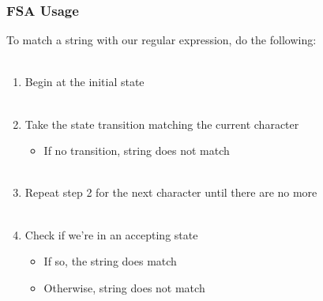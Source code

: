 \documentclass[aspectratio=169]{beamer}
\newenvironment{fsa}{\begin{center}
\begin{tikzpicture}[shorten >=1pt, initial text=]
  \tikzstyle{every state}=[draw=solarizedAccent, node distance=2cm,
                           minimum size=1cm]
  \tikzstyle{accepting}=[double=solarizedRebase03]}{\end{tikzpicture}
\end{center}}
\begin{document}

\begin{frame}
\frametitle{FSA Usage}

To match a string with our \alert{regular expression}, do the following:\\~\\

\begin{enumerate}
  \item Begin at the initial state\\~\\
  \item Take the \alert{state transition} matching the current character
    \begin{itemize}
      \item If no transition, string does not match\\~\\
    \end{itemize}
  \item Repeat step 2 for the next character until there are no more\\~\\
  \item Check if we're in an accepting state

    \begin{itemize}
      \item If so, the string does match
      \item Otherwise, string does not match
    \end{itemize}
\end{enumerate}
\end{frame}
\end{document}
